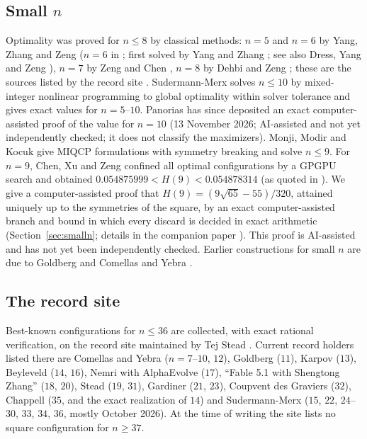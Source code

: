 \documentclass[11pt]{amsart}
\theoremstyle{definition}
\begin{document}
\subsection*{Small \texorpdfstring{$n$}{n}}
Optimality was proved for $n \le 8$ by classical methods: $n = 5$ and $n = 6$ by Yang, Zhang and Zeng \cite{YZZ,YZZ92} ($n = 6$ in \cite[Theorem~3]{YZZ92}; first solved by Yang and Zhang \cite{YZ80}; see also Dress, Yang and Zeng \cite{DYZ}), $n = 7$ by Zeng and Chen \cite{ZC}, $n = 8$ by Dehbi and Zeng \cite{DZ}; these are the sources listed by the record site \cite{Stead}. %
Sudermann-Merx \cite{SM} solves $n \le 10$ by mixed-integer nonlinear programming to global optimality within solver tolerance and gives exact values for $n = 5$--$10$. Panorias \cite{Pan10} has since deposited an exact computer-assisted proof of the value for $n = 10$ (13 November 2026; AI-assisted and not yet independently checked; it does not classify the maximizers). %
Monji, Modir and Kocuk \cite{MMK} give MIQCP formulations with symmetry breaking and solve $n \le 9$. %
For $n = 9$, Chen, Xu and Zeng \cite{Chen17} confined all optimal configurations by a GPGPU search and obtained $0.054875999 < H(9) < 0.054878314$ (as quoted in \cite{MMK}). %
We give a computer-assisted proof that $H(9) = (9\sqrt{65}-55)/320$, attained uniquely up to the symmetries of the square, by an exact computer-assisted branch and bound in which every discard is decided in exact arithmetic (Section~\ref{sec:smalln}; details in the companion paper \cite{N9}). This proof is AI-assisted and has not yet been independently checked. %
Earlier constructions for small $n$ are due to Goldberg \cite{Goldberg} and Comellas and Yebra \cite{CY}.

\subsection*{The record site}
Best-known configurations for $n \le 36$ are collected, with exact rational verification, on the record site maintained by Tej Stead \cite{Stead}. %
Current record holders listed there are Comellas and Yebra ($n = 7$--$10$, $12$), Goldberg ($11$), Karpov ($13$), Beyleveld ($14$, $16$), Nemri with AlphaEvolve ($17$), ``Fable 5.1 with Shengtong Zhang'' ($18$, $20$), Stead ($19$, $31$), Gardiner ($21$, $23$), Coupvent des Graviers ($32$), Chappell ($35$, and the exact realization of $14$) and Sudermann-Merx ($15$, $22$, $24$--$30$, $33$, $34$, $36$, mostly October 2026). %
At the time of writing the site lists no square configuration for $n \ge 37$. %
\end{document}
